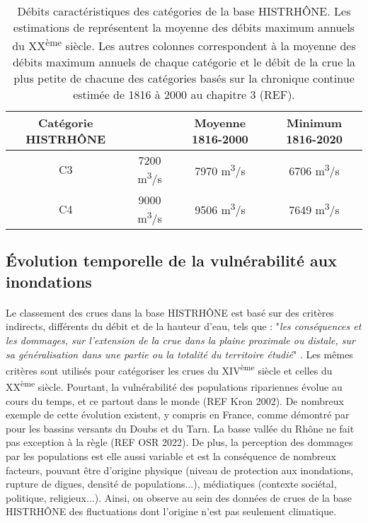 \documentclass[11pt]{article}
\begin{document}
	\begin{table}[h]
	\centering
	\caption{Débits caractéristiques des catégories de la base HISTRHÔNE. Les estimations de \citet{pichard_hydro-climatology_2017} représentent la moyenne des débits maximum annuels du XX\textsuperscript{ème} siècle. Les autres colonnes correspondent à la moyenne des débits maximum annuels de chaque catégorie et le débit de la crue la plus petite de chacune des catégories basés sur la chronique continue estimée de 1816 à 2000 au chapitre 3 (REF).} 
	\label{tab:Qcateg}
		\begin{tabular}{|c|c|c|c|}
		\hline
		Catégorie HISTRHÔNE & \citet{pichard_hydro-climatology_2017} & Moyenne 1816-2000 & Minimum 1816-2020\\ \hline
		C3  & 7200 m\textsuperscript{3}/s  & 7970 m\textsuperscript{3}/s    & 6706 m\textsuperscript{3}/s   \\ \hline
		C4  & 9000 m\textsuperscript{3}/s  & 9506 m\textsuperscript{3}/s    & 7649 m\textsuperscript{3}/s   \\ \hline
		\end{tabular}
	\end{table}
	
	\subsection{Évolution temporelle de la vulnérabilité aux inondations}
	
	\paragraph{} Le classement des crues dans la base HISTRHÔNE est basé sur des critères indirects, différents du débit et de la hauteur d'eau, tels que : "\textit{les conséquences et les dommages, sur l'extension de la crue dans la plaine proximale ou distale, sur sa généralisation dans une partie ou la totalité du territoire étudié}" \citep{pichard_sept_2014}. Les mêmes critères sont utilisés pour catégoriser les crues du XIV\textsuperscript{ème} siècle et celles du XX\textsuperscript{ème} siècle. Pourtant, la vulnérabilité des populations ripariennes évolue au cours du temps, et ce partout dans le monde (REF Kron 2002). De nombreux exemple de cette évolution existent, y compris en France, comme démontré par \citet{boudou_assessing_2016} pour les bassins versants du Doubs et du Tarn. La basse vallée du Rhône ne fait pas exception à la règle (REF OSR 2022). De plus, la perception des dommages par les populations est elle aussi variable et est la conséquence de nombreux facteurs, pouvant être d'origine physique (niveau de protection aux inondations, rupture de digues, densité de populations...), médiatiques (contexte sociétal, politique, religieux...). Ainsi, on observe au sein des données de crues de la base HISTRHÔNE des fluctuations dont l'origine n'est pas seulement climatique. 
	
\end{document}
